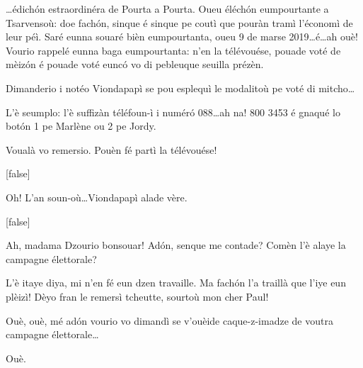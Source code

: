 \begin{drama}

\Brunospeaks \ldots édich\'on estraordinéra de Pourta a Pourta. Oueu éléch\'on eumpourtante a  Tsarvensoù: doe fach\'on, sinque é sinque pe coutì que pouràn tramì l'économì de leur péì. Saré eunna souaré bièn eumpourtanta, oueu 9 de marse 2019\ldots é\ldots ah ouè! Vourio rappelé eunna baga eumpourtanta: n'en la télévouése, pouade voté de mèiz\'on é pouade voté eunc\'o vo di pebleuque seuilla prézèn.


\Brunospeaks {} Dimanderio i notéo Viondapapì se pou esplequì le modalitoù pe voté di mitcho\ldots

\Noteospeaks L'è seumplo: l'è suffizàn téléfoun-ì i num\'er\'o 088\ldots ah na! 800 3453 é gnaqué lo bot\'on 1 pe Marlène ou 2 pe Jordy.
 
\Brunospeaks Voualà vo remersio. Pouèn fé partì la télévouése!



[false]

\Brunospeaks {} Oh! L'an soun-où\ldots Viondapapì alade vère. 


[false]


\Brunospeaks Ah, madama Dzourio bonsouar! Ad\'on, senque me con\-ta\-de? Comèn l'è alaye la campagne élettorale? 

\Presidanspeaks L'è itaye diya, mi n'en fé eun dzen travaille. Ma fach\'on l'a traillà que l'iye eun plèizì!
Dèyo fran le remersì tcheutte, sourtoù mon cher Paul!

\Brunospeaks Ouè, ouè, mé ad\'on vourio vo dimandì se v'ouèide caque-z-imadze de voutra campagne élettorale\ldots

\Presidanspeaks Ouè.


\end{drama}
